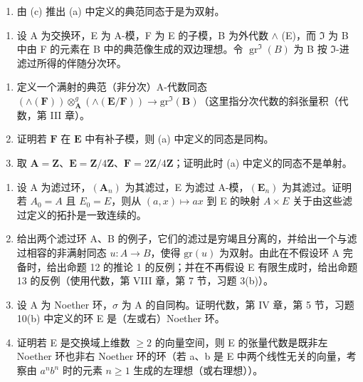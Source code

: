 \begin{enumerate}
\def\labelenumi{(\alph{enumi})}
\setcounter{enumi}{3}
\tightlist
\item
  由 (c) 推出 (a) 中定义的典范同态于是为双射。
\end{enumerate}

\begin{enumerate}
\def\labelenumi{\arabic{enumi}.}
\setcounter{enumi}{6}
\tightlist
\item
  设 A 为交换环，E 为 A-模，F 为 E 的子模，B 为外代数 \(\wedge\) (E)，而 \(\Im\) 为 B 中由 F 的元素在 B 中的典范像生成的双边理想。令 \(\operatorname{gr}^{\Im}(B)\) 为 B 按 \(\Im\)-进滤过所得的伴随分次环。
\end{enumerate}

\begin{enumerate}
\def\labelenumi{(\alph{enumi})}
\item
   定义一个满射的典范（非分次）A-代数同态 \((\wedge (\mathbf{F})) \otimes_{\mathbf{A}}^{g}(\wedge (\mathbf{E} / \mathbf{F})) \to \mathrm{gr}^{\Im} (\mathbf{B})\)（这里指分次代数的斜张量积（代数，第 III 章）。
\item
  证明若 \(\mathbf{F}\) 在 \(\mathbf{E}\) 中有补子模，则 (a) 中定义的同态是同构。
\item
   取 \(\mathbf{A} = \mathbf{Z}\)、\(\mathbf{E} = \mathbf{Z} / 4\mathbf{Z}\)、\(\mathbf{F} = 2\mathbf{Z} / 4\mathbf{Z}\)；证明此时 (a) 中定义的同态不是单射。
\end{enumerate}

\begin{enumerate}
\def\labelenumi{\arabic{enumi}.}
\setcounter{enumi}{7}
\item
  设 A 为滤过环，\((\mathbf{A}_{n})\) 为其滤过，E 为滤过 A-模，\((\mathbf{E}_{n})\) 为其滤过。证明若 \(A_{0} = A\) 且 \(E_{0} = E\)，则从 \((a, x) \mapsto ax\) 到 E 的映射 \(A \times E\) 关于由这些滤过定义的拓扑是一致连续的。
\item
  给出两个滤过环 A、B 的例子，它们的滤过是穷竭且分离的，并给出一个与滤过相容的非满射同态 \(u: A \to B\)，使得 \(\text{gr}(u)\) 为双射。由此在不假设环 A 完备时，给出命题 12 的推论 1 的反例；并在不再假设 E 有限生成时，给出命题 13 的反例（使用代数，第 VIII 章，第 7 节，习题 3(b)）。
\item
  设 A 为 Noether 环，\(\sigma\) 为 A 的自同构。证明代数，第 IV 章，第 5 节，习题 10(b) 中定义的环 E 是（左或右）Noether 环。
\item
  证明若 E 是交换域上维数 \(\geqslant2\) 的向量空间，则 E 的张量代数是既非左 Noether 环也非右 Noether 环的环（若 a、b 是 E 中两个线性无关的向量，考察由 \(a^{n}b^{n}\) 时的元素 \(n\geqslant1\) 生成的左理想（或右理想））。
\end{enumerate}

